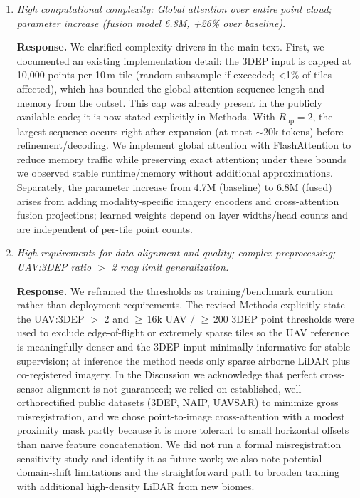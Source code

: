 \documentclass[11pt]{article}
\newcommand{\response}{\textbf{Response.} }
\begin{document}
\begin{enumerate}
  \item \emph{High computational complexity: Global attention over entire point cloud; parameter increase (fusion model 6.8M, +26\% over baseline).}

  \response We clarified complexity drivers in the main text. First, we documented an existing implementation detail: the 3DEP input is capped at 10,000 points per 10\,m tile (random subsample if exceeded; \textless{}1\% of tiles affected), which has bounded the global-attention sequence length and memory from the outset. This cap was already present in the publicly available code; it is now stated explicitly in Methods. With $R_{\text{up}}{=}2$, the largest sequence occurs right after expansion (at most $\sim$20k tokens) before refinement/decoding. We implement global attention with FlashAttention to reduce memory traffic while preserving exact attention; under these bounds we observed stable runtime/memory without additional approximations. Separately, the parameter increase from 4.7M (baseline) to 6.8M (fused) arises from adding modality-specific imagery encoders and cross-attention fusion projections; learned weights depend on layer widths/head counts and are independent of per-tile point counts.

  \item \emph{High requirements for data alignment and quality; complex preprocessing; UAV:3DEP ratio $>$ 2 may limit generalization.}

  \response We reframed the thresholds as training/benchmark curation rather than deployment requirements. The revised Methods explicitly state the UAV:3DEP $>$ 2 and $\geq$\,16k UAV / $\geq$\,200 3DEP point thresholds were used to exclude edge-of-flight or extremely sparse tiles so the UAV reference is meaningfully denser and the 3DEP input minimally informative for stable supervision; at inference the method needs only sparse airborne LiDAR plus co-registered imagery. In the Discussion we acknowledge that perfect cross-sensor alignment is not guaranteed; we relied on established, well-orthorectified public datasets (3DEP, NAIP, UAVSAR) to minimize gross misregistration, and we chose point-to-image cross-attention with a modest proximity mask partly because it is more tolerant to small horizontal offsets than naïve feature concatenation. We did not run a formal misregistration sensitivity study and identify it as future work; we also note potential domain-shift limitations and the straightforward path to broaden training with additional high-density LiDAR from new biomes.
\end{enumerate}
\end{document}
